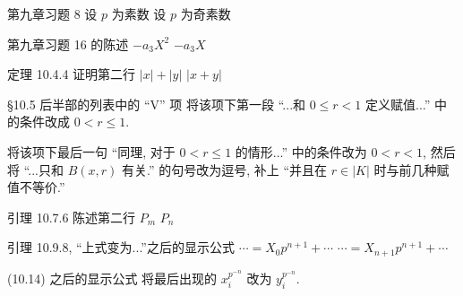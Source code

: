 \documentclass{AJerrata}
\begin{document}
\begin{Errata}
		\item[第九章习题 8]
		\Orig 设 $p$ 为素数
		\Corr 设 $p$ 为奇素数
		
		\item[第九章习题 16 的陈述]
		\Orig $-a_3 X^2$
		\Corr $-a_3 X$
		
		\item[定理 10.4.4 证明第二行]
		\Orig $|x|+|y|$
		\Corr $|x+y|$
		
		\item[\S 10.5 后半部的列表中的 ``V'' 项]
		将该项下第一段 ``...和 $0 \leq r < 1$ 定义赋值...'' 中的条件改成 $0 < r \leq 1$.
		
		将该项下最后一句 ``同理, 对于 $0 < r \leq 1$ 的情形...'' 中的条件改为 $0 < r < 1$, 然后将 ``...只和 $B(x, r)$ 有关.'' 的句号改为逗号, 补上 ``并且在 $r \in |K|$ 时与前几种赋值不等价.''
		
		\item[引理 10.7.6 陈述第二行]
		\Orig $P_m$
		\Corr $P_n$
		
		\item[引理 10.9.8, ``上式变为...''之后的显示公式]
		\Orig $\cdots = X_0 p^{n+1} + \cdots$
		\Corr $\cdots = X_{n+1} p^{n+1} + \cdots$
		
		\item[(10.14) 之后的显示公式]
		将最后出现的 $x_i^{p^{-n}}$ 改为 $y_i^{p^{-n}}$.
	\end{Errata}
\end{document}
